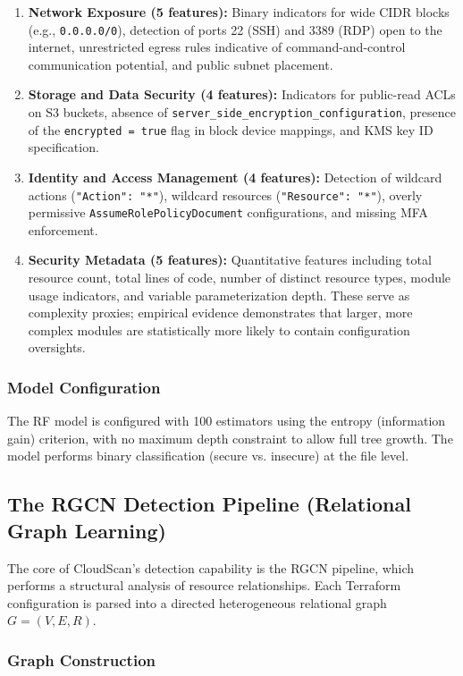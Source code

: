 \documentclass[conference]{IEEEtran}
\begin{document}
\begin{enumerate}
    \item \textbf{Network Exposure (5 features):} Binary indicators for wide CIDR blocks (e.g., \texttt{0.0.0.0/0}), detection of ports 22 (SSH) and 3389 (RDP) open to the internet, unrestricted egress rules indicative of command-and-control communication potential, and public subnet placement.
    \item \textbf{Storage and Data Security (4 features):} Indicators for public-read ACLs on S3 buckets, absence of \texttt{server\_side\_encryption\_configuration}, presence of the \texttt{encrypted = true} flag in block device mappings, and KMS key ID specification.
    \item \textbf{Identity and Access Management (4 features):} Detection of wildcard actions (\texttt{"Action": "*"}), wildcard resources (\texttt{"Resource": "*"}), overly permissive \texttt{AssumeRolePolicyDocument} configurations, and missing MFA enforcement.
    \item \textbf{Security Metadata (5 features):} Quantitative features including total resource count, total lines of code, number of distinct resource types, module usage indicators, and variable parameterization depth. These serve as complexity proxies; empirical evidence demonstrates that larger, more complex modules are statistically more likely to contain configuration oversights.
\end{enumerate}

\subsubsection{Model Configuration}

The RF model is configured with 100 estimators using the entropy (information gain) criterion, with no maximum depth constraint to allow full tree growth. The model performs binary classification (secure vs. insecure) at the file level.

\subsection{The RGCN Detection Pipeline (Relational Graph Learning)}

The core of CloudScan's detection capability is the RGCN pipeline, which performs a structural analysis of resource relationships. Each Terraform configuration is parsed into a directed heterogeneous relational graph $G = (V, E, R)$.

\subsubsection{Graph Construction}
\end{document}
